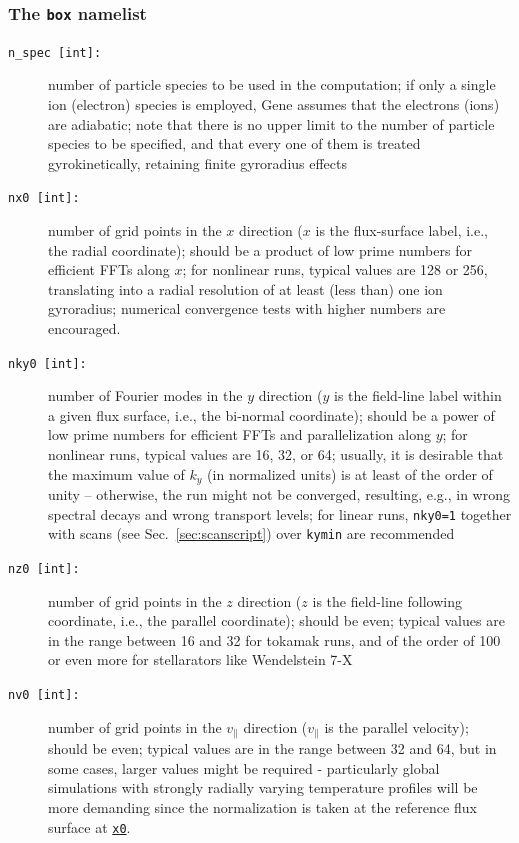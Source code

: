 \documentclass[12pt]{article}
\begin{document}
\subsubsection{The \texttt{box} namelist}
\begin{description}
\item[\hypertarget{n_spec}{\tt n\_spec [int]:}] number of particle species to be used in the computation; if only a single
ion (electron) species is employed, {\sc Gene} assumes that the electrons (ions) are adiabatic; note
that there is no upper limit to the number of particle species to be specified, and that every one
of them is treated gyrokinetically, retaining finite gyroradius effects
\item[\hypertarget{nx0}{\tt nx0 [int]:}] number of grid points in the $x$ direction ($x$ is the flux-surface label,
i.e., the radial coordinate); should be a product of low prime numbers for efficient FFTs along $x$;
for nonlinear runs, typical values are 128 or 256, translating into a radial resolution of at least (less than)
one ion gyroradius; numerical convergence tests with higher numbers are encouraged.
\item[\hypertarget{nky0}{\tt nky0 [int]:}] number of Fourier modes in the $y$ direction ($y$ is the field-line label within
a given flux surface, i.e., the bi-normal coordinate); should be a power of low prime numbers for efficient FFTs and parallelization
along $y$; for nonlinear runs, typical values are 16, 32, or 64; usually, it is desirable that the maximum value of $k_y$ (in normalized units)
is at least of the order of unity -- otherwise, the run might not be converged, resulting, e.g., in wrong
spectral decays and wrong transport levels; for linear runs, \texttt{nky0=1} together with scans
(see Sec.~\ref{sec:scanscript}) over \texttt{kymin} are recommended
\item[\hypertarget{nz0}{\tt nz0 [int]:}] number of grid points in the $z$ direction ($z$ is the field-line following
coordinate, i.e., the parallel coordinate); should be even; typical values are in the range between 16
and 32 for tokamak runs, and of the order of 100 or even more for stellarators like Wendelstein 7-X
\item[\hypertarget{nv0}{\tt nv0 [int]:}] number of grid points in the $v_\|$ direction ($v_\|$ is the parallel velocity);
should be even; typical values are in the range between 32 and 64, but in some cases, larger values
might be required - particularly global simulations with strongly radially varying temperature profiles will
be more demanding since the normalization is taken at the reference flux surface at \hyperlink{x0}{\tt x0}.

\end{description}
\end{document}
